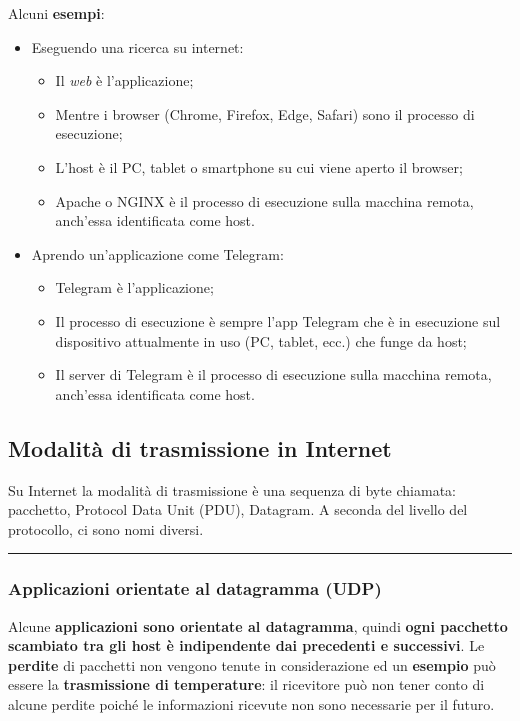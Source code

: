 \documentclass[a4paper]{article}
\newcommand{\longline}{\noindent\rule{\textwidth}{0.4pt}}
\begin{document}
	\noindent
	Alcuni \textcolor{Green4}{\textbf{esempi}}:
	\begin{itemize}
		\item Eseguendo una ricerca su internet:
		\begin{itemize}
			\item Il \emph{web} è l'applicazione;
			\item Mentre i browser (Chrome, Firefox, Edge, Safari) sono il processo di esecuzione;
			\item L'host è il PC, tablet o smartphone su cui viene aperto il browser;
			\item Apache o NGINX è il processo di esecuzione sulla macchina remota, anch'essa identificata come host.
		\end{itemize}
		
		\item Aprendo un'applicazione come Telegram:
		\begin{itemize}
			\item Telegram è l'applicazione;
			\item Il processo di esecuzione è sempre l'app Telegram che è in esecuzione sul dispositivo attualmente in uso (PC, tablet, ecc.) che funge da host;
			\item Il server di Telegram è il processo di esecuzione sulla macchina remota, anch'essa identificata come host.
		\end{itemize}
	\end{itemize}\newpage

	\subsection{Modalità di trasmissione in Internet}
	
	Su Internet la modalità di trasmissione è una sequenza di byte chiamata: pacchetto, Protocol Data Unit (PDU), Datagram. A seconda del livello del protocollo, ci sono nomi diversi.
	
	\longline
	
	\subsubsection{Applicazioni orientate al datagramma (UDP)}
	
	Alcune \textbf{applicazioni sono orientate al datagramma}, quindi \textbf{ogni pacchetto scambiato tra gli host è indipendente dai precedenti e successivi}. Le \textbf{perdite} di pacchetti non vengono tenute in considerazione ed un \textcolor{Green4}{\textbf{esempio}} può essere la \textbf{trasmissione di temperature}: il ricevitore può non tener conto di alcune perdite poiché le informazioni ricevute non sono necessarie per il futuro.
	
\end{document}

